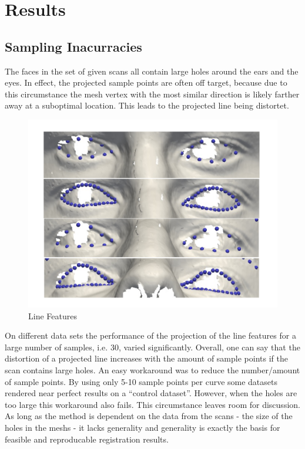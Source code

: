 \chapter{Results}

\section{Sampling Inacurracies}
The faces in the set of given scans all contain large holes around the ears and the eyes. In effect, the projected sample points are often off target, because due to this circumstance the mesh vertex with the most similar direction is likely farther away at a suboptimal location. This leads to the projected line being distortet.
\begin{figure}[h!]
    \centering
    \includegraphics[width=.7\textwidth]{./resources/img/linefeatures_eyes.pdf}
    \caption{Line Features}
    \label{fig:linefeature_comparison}
\end{figure}

On different data sets the performance of the projection of the line features for a large number of
samples, i.e. 30, varied significantly. Overall, one can say that the distortion of a projected line increases with the amount of sample points if the scan contains large holes.
An easy workaround was to reduce the number/amount of sample points. By using only 5-10 sample points per curve some datasets rendered near perfect results on a ``control dataset''. However, when the holes are too large this workaround also fails. This circumstance leaves room for discussion. As long as the method is dependent on the data from the scans - the size of the holes in the meshs - it lacks generality and generality is exactly the basis for feasible and reproducable registration results.\\

